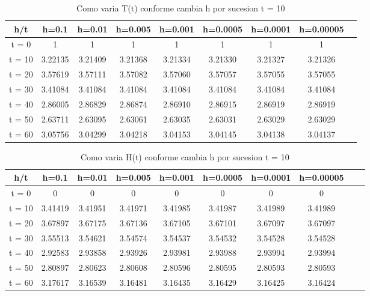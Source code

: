 \begin{table}[H]
    \centering
    \begin{tabular}{|c|c|c|c|c|c|c|c|c|}
        \hline
        h/t & h=0.1 & h=0.01 & h=0.005 & h=0.001 & h=0.0005 & h=0.0001 & h=0.00005\\
        \hline
        t = 0 & 1 & 1 & 1 & 1 & 1 & 1 & 1 \\
        \hline
        t = 10 & 3.22135 & 3.21409 & 3.21368 & 3.21334 & 3.21330 & 3.21327 & 3.21326\\
        \hline
        t = 20 & 3.57619 & 3.57111 & 3.57082 & 3.57060 & 3.57057 & 3.57055 & 3.57055\\
        \hline
        t = 30 & 3.41084 & 3.41084 & 3.41084 & 3.41084 & 3.41084 & 3.41084 & 3.41084\\
        \hline
        t = 40 & 2.86005 & 2.86829 & 2.86874 & 2.86910 & 2.86915 & 2.86919 & 2.86919\\ 
        \hline
        t = 50 & 2.63711 & 2.63095 & 2.63061 & 2.63035 & 2.63031 & 2.63029 & 2.63029\\
        \hline
        t = 60 & 3.05756 & 3.04299 & 3.04218 & 3.04153 & 3.04145 & 3.04138 & 3.04137\\
        \hline
    \end{tabular}
    \caption{Como varia T(t) conforme cambia h por sucesion t = 10}
\end{table}


\begin{table}[H]
    \centering
    \begin{tabular}{|c|c|c|c|c|c|c|c|c|c|}
        \hline
        h/t & h=0.1 & h=0.01 & h=0.005 & h=0.001 & h=0.0005 & h=0.0001 & h=0.00005\\
        \hline
        t = 0 & 0 & 0 & 0 & 0 & 0 & 0 & 0 \\
        \hline
        t = 10 & 3.41419 & 3.41951 & 3.41971 & 3.41985 & 3.41987 & 3.41989 & 3.41989\\
        \hline
        t = 20 & 3.67897 & 3.67175 & 3.67136 & 3.67105 & 3.67101 & 3.67097 & 3.67097\\
        \hline
        t = 30 & 3.55513 & 3.54621 & 3.54574 & 3.54537 & 3.54532 & 3.54528 & 3.54528 \\
        \hline
        t = 40 & 2.92583 & 2.93858 & 2.93926 & 2.93981 & 2.93988 & 2.93994 & 2.93994\\
        \hline
        t = 50 & 2.80897 & 2.80623 & 2.80608 & 2.80596 & 2.80595 & 2.80593 & 2.80593 \\
        \hline
        t = 60 & 3.17617 & 3.16539 & 3.16481 & 3.16435 & 3.16429 & 3.16425 & 3.16424\\
        \hline
    \end{tabular}
    \caption{Como varia H(t) conforme cambia h por sucesion t = 10}
\end{table}

